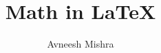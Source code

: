 

\title{Math in \LaTeX}

\author{Avneesh Mishra}


    \maketitle
    \tableofcontents
    \pagebreak
    
    \pagebreak
    

